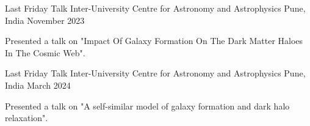 \begin{cventries}
{
\cventry
{Last Friday Talk}
{Inter-University Centre for Astronomy and Astrophysics}
{Pune, India}
{November 2023}
{
\begin{cvitems}
\item {Presented a talk on "Impact Of Galaxy Formation On The Dark Matter Haloes In The Cosmic Web".}
\end{cvitems}
}
}

{
\cventry
{Last Friday Talk}
{Inter-University Centre for Astronomy and Astrophysics}
{Pune, India}
{March 2024}
{
\begin{cvitems}
\item {Presented a talk on "A self-similar model of galaxy 
formation and dark halo relaxation".}
\end{cvitems}
}
}

\end{cventries}